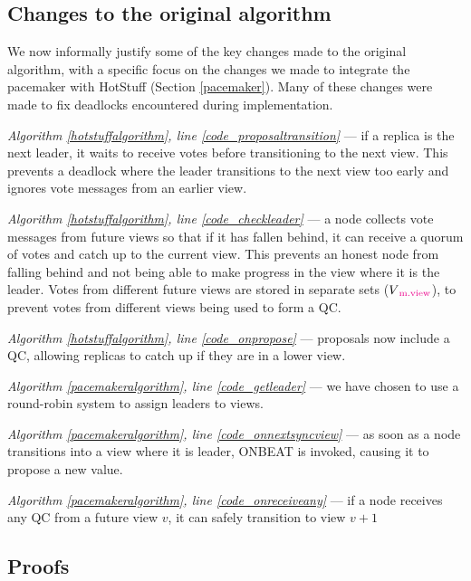 \subsection{Changes to the original algorithm}
We now informally justify some of the key changes made to the original algorithm, with a specific focus on the changes we made to integrate the pacemaker with HotStuff (Section \ref{pacemaker}). Many of these changes were made to fix deadlocks encountered during implementation.

\begin{description}
	\item \textit{Algorithm \ref{hotstuffalgorithm}, line \ref{code_proposaltransition}} --- if a replica is the next leader, it waits to receive votes before transitioning to the next view. This prevents a deadlock where the leader transitions to the next view too early and ignores vote messages from an earlier view.
	\item \textit{Algorithm \ref{hotstuffalgorithm}, line \ref{code_checkleader}} --- a node collects vote messages from future views so that if it has fallen behind, it can receive a quorum of votes and catch up to the current view. This prevents an honest node from falling behind and not being able to make progress in the view where it is the leader. Votes from different future views are stored in separate sets ($V\textcolor{Magenta}{\textsubscript{m.view}}$), to prevent votes from different views being used to form a QC.
	\item \textit{Algorithm \ref{hotstuffalgorithm}, line \ref{code_onpropose}} --- proposals now include a QC, allowing replicas to catch up if they are in a lower view.
	\item \textit{Algorithm \ref{pacemakeralgorithm}, line \ref{code_getleader}} --- we have chosen to use a round-robin system to assign leaders to views.
	\item \textit{Algorithm \ref{pacemakeralgorithm}, line \ref{code_onnextsyncview}} --- as soon as a node transitions into a view where it is leader, ON{\large B}EAT is invoked, causing it to propose a new value.
	\item \textit{Algorithm \ref{pacemakeralgorithm}, line \ref{code_onreceiveany}} --- if a node receives any QC from a future view $v$, it can safely transition to view $v + 1$
\end{description}

\subsection{Proofs} \label{proof}


